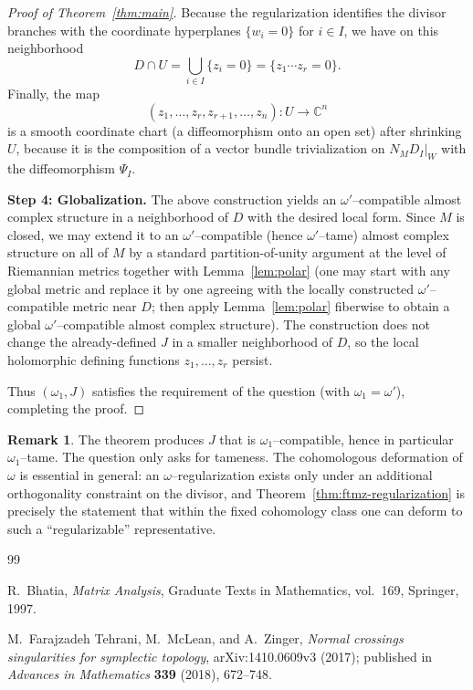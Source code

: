 \documentclass[11pt]{article}
\theoremstyle{definition}
\newtheorem{remark}[theorem]{Remark}
\begin{document}
\begin{proof}[Proof of Theorem~\ref{thm:main}]
Because the regularization identifies the divisor branches with the coordinate hyperplanes $\{w_i=0\}$ for $i\in I$,
we have on this neighborhood
\[
D\cap U = \bigcup_{i\in I}\{z_i=0\} = \{z_1\cdots z_r=0\}.
\]
Finally, the map
\[
(z_1,\dots,z_r,z_{r+1},\dots,z_n)\colon U \longrightarrow \mathbb C^n
\]
is a smooth coordinate chart (a diffeomorphism onto an open set) after shrinking $U$, because it is the composition of a vector bundle
trivialization on $N_MD_I|_W$ with the diffeomorphism $\Psi_I$.

\smallskip\noindent
\textbf{Step 4: Globalization.}
The above construction yields an $\omega'$--compatible almost complex structure in a neighborhood of $D$ with the desired local form.
Since $M$ is closed, we may extend it to an $\omega'$--compatible (hence $\omega'$--tame) almost complex structure on all of $M$ by
a standard partition-of-unity argument at the level of Riemannian metrics together with Lemma~\ref{lem:polar}
(one may start with any global metric and replace it by one agreeing with the locally constructed $\omega'$--compatible metric near $D$;
then apply Lemma~\ref{lem:polar} fiberwise to obtain a global $\omega'$--compatible almost complex structure).
The construction does not change the already-defined $J$ in a smaller neighborhood of $D$, so the local holomorphic defining functions
$z_1,\dots,z_r$ persist.

Thus $(\omega_1,J)$ satisfies the requirement of the question (with $\omega_1=\omega'$), completing the proof.
\end{proof}

\begin{remark}
The theorem produces $J$ that is $\omega_1$--compatible, hence in particular $\omega_1$--tame. The question only asks for tameness.
The cohomologous deformation of $\omega$ is essential in general: an $\omega$--regularization exists only under an additional
orthogonality constraint on the divisor, and Theorem~\ref{thm:ftmz-regularization} is precisely the statement that within the fixed
cohomology class one can deform to such a ``regularizable'' representative.
\end{remark}

\begin{thebibliography}{99}

R.~Bhatia,
\emph{Matrix Analysis},
Graduate Texts in Mathematics, vol.~169, Springer, 1997.

M.~Farajzadeh Tehrani, M.~McLean, and A.~Zinger,
\emph{Normal crossings singularities for symplectic topology},
arXiv:1410.0609v3 (2017); published in \emph{Advances in Mathematics} \textbf{339} (2018), 672--748.

\end{thebibliography}
\end{document}
